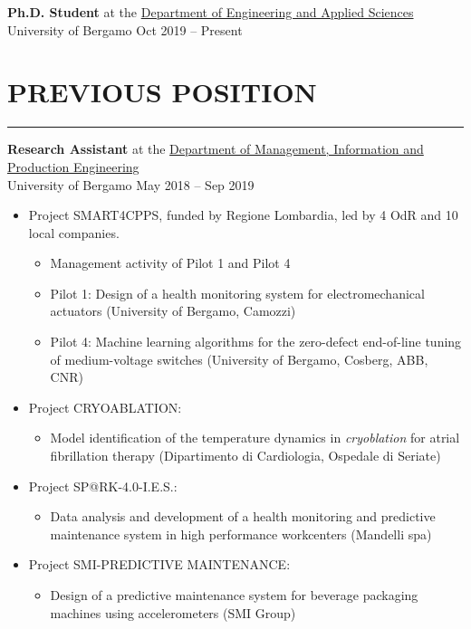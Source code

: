 \documentclass[10pt]{article}
\newcommand{\cvsection}[1]{\section*{\centering\normalsize\uppercase{#1}}\vspace{-16pt}\rule{\linewidth}{0.2pt}}
\begin{document}
\textbf{Ph.D. Student} at the \href{https://disa.unibg.it/}{Department of Engineering and Applied Sciences}\\
University of Bergamo \hfill Oct 2019 – Present


\cvsection{previous position}

\textbf{Research Assistant} at the \href{https://digip.unibg.it/}{Department of Management, Information and Production Engineering}\\
University of Bergamo \hfill May 2018 – Sep 2019
\begin{itemize}
  	\setlength\itemsep{-0.5em}
	\renewcommand\labelitemii{$\vcenter{\hbox{\tiny$\bullet$}}$}

  	\item Project SMART4CPPS, funded by Regione Lombardia, led by 4 OdR and 10 local companies.
  	\vspace{-6pt}
  	\begin{itemize}
  		\setlength\itemsep{-0.5em}
  		\item Management activity of Pilot 1 and Pilot 4
		\item Pilot 1: Design of a health monitoring system for electromechanical actuators (University of Bergamo, Camozzi)
		\item Pilot 4: Machine learning algorithms for the zero-defect end-of-line tuning of medium-voltage switches (University of Bergamo, Cosberg, ABB, CNR)
	\end{itemize}

	\item Project CRYOABLATION:
  	\vspace{-6pt}
  	\begin{itemize}
  		\setlength\itemsep{-0.5em}
		\item Model identification of the temperature dynamics in \textit{cryoblation} for atrial fibrillation therapy (Dipartimento di Cardiologia, Ospedale di Seriate)
	\end{itemize}

	\item Project SP@RK-4.0-I.E.S.:
	 \vspace{-6pt}
  	\begin{itemize}
  		\setlength\itemsep{-0.5em}
		\item Data analysis and development of a health monitoring and predictive maintenance system in high performance workcenters (Mandelli spa)
	\end{itemize}

	\item Project SMI-PREDICTIVE MAINTENANCE:
  	\vspace{-6pt}
  	\begin{itemize}
  		\setlength\itemsep{-0.5em}
		\item Design of a predictive maintenance system for beverage packaging machines using accelerometers (SMI Group)
	\end{itemize}
\end{itemize}
\end{document}
